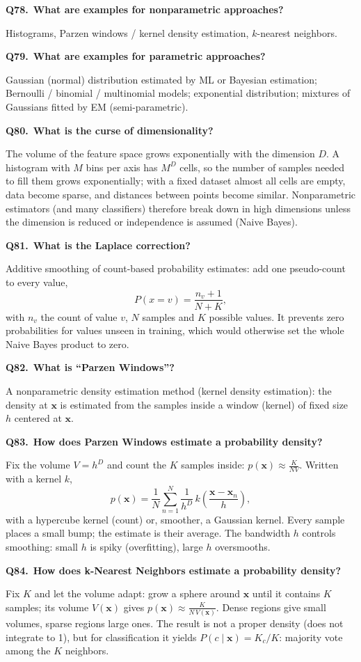 \documentclass[11pt,a4paper]{article}
\newcommand{\keep}[1]{\par
  \ifdim\dimexpr\pagegoal-\pagetotal\relax<#1\relax\newpage\fi}
\newcommand{\q}[2]{\keep{2.5cm}\medskip
  {\sffamily\bfseries\color{questc}Q#1.}\ {\sffamily\bfseries #2}\par}
\begin{document}
\q{78}{What are examples for nonparametric approaches?}
Histograms, Parzen windows / kernel density estimation, $k$-nearest neighbors.

\q{79}{What are examples for parametric approaches?}
Gaussian (normal) distribution estimated by ML or Bayesian estimation;
Bernoulli / binomial / multinomial models; exponential distribution; mixtures of
Gaussians fitted by EM (semi-parametric).

\q{80}{What is the curse of dimensionality?}
The volume of the feature space grows exponentially with the dimension $D$.
A histogram with $M$ bins per axis has $M^D$ cells, so the number of samples
needed to fill them grows exponentially; with a fixed dataset almost all cells
are empty, data become sparse, and distances between points become similar.
Nonparametric estimators (and many classifiers) therefore break down in high
dimensions unless the dimension is reduced or independence is assumed (Naive
Bayes).

\q{81}{What is the Laplace correction?}
Additive smoothing of count-based probability estimates: add one pseudo-count
to every value,
\[
  P(x=v) = \frac{n_v + 1}{N + K},
\]
\noindent
with $n_v$ the count of value $v$, $N$ samples and $K$ possible values. It
prevents zero probabilities for values unseen in training, which would otherwise
set the whole Naive Bayes product to zero.

\q{82}{What is ``Parzen Windows''?}
A nonparametric density estimation method (kernel density estimation): the
density at $\mathbf{x}$ is estimated from the samples inside a window (kernel)
of fixed size $h$ centered at $\mathbf{x}$.

\q{83}{How does Parzen Windows estimate a probability density?}
Fix the volume $V = h^D$ and count the $K$ samples inside:
$p(\mathbf{x}) \approx \frac{K}{NV}$. Written with a kernel $k$,
\[
  p(\mathbf{x}) = \frac{1}{N}\sum_{n=1}^N \frac{1}{h^D}\,
  k\!\left(\frac{\mathbf{x}-\mathbf{x}_n}{h}\right),
\]
\noindent
with a hypercube kernel (count) or, smoother, a Gaussian kernel. Every sample
places a small bump; the estimate is their average. The bandwidth $h$ controls
smoothing: small $h$ is spiky (overfitting), large $h$ oversmooths.

\q{84}{How does k-Nearest Neighbors estimate a probability density?}
Fix $K$ and let the volume adapt: grow a sphere around $\mathbf{x}$ until it
contains $K$ samples; its volume $V(\mathbf{x})$ gives
$p(\mathbf{x}) \approx \frac{K}{N\,V(\mathbf{x})}$. Dense regions give small
volumes, sparse regions large ones. The result is not a proper density (does
not integrate to 1), but for classification it yields
$P(c\mid\mathbf{x}) = K_c/K$: majority vote among the $K$ neighbors.
\end{document}
